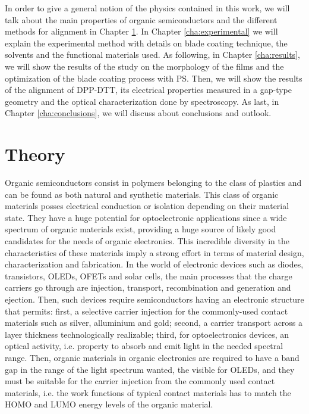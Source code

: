 \documentclass  [
  paper    = a4,
  BCOR     = 10mm,
  twoside,
  fontsize = 12pt,
  fleqn,
  toc      = bibnumbered,
  toc      = listofnumbered,
  numbers  = noendperiod,
  headings = normal,
  listof   = leveldown,
  version  = 3.03
]                                       {scrreprt}
\begin{document}
In order to give a general notion of the physics contained in this work, we will talk about the main properties of organic semiconductors and the different methods for alignment in Chapter \ref{cha:theory}. In Chapter \ref{cha:experimental} we will explain the experimental method with details on blade coating technique, the solvents and the functional materials used. As following, in Chapter \ref{cha:results}, we will show the results of the study on the morphology of the films and the optimization of the blade coating process with PS. Then, we will show the results of the alignment of DPP-DTT, its electrical properties measured in a gap-type geometry and the optical characterization done by spectroscopy. As last, in Chapter \ref{cha:conclusions}, we will discuss about conclusions and outlook.


\chapter{Theory}\label{cha:theory}


Organic semiconductors consist in polymers belonging to the class of plastics and can be found as both natural and synthetic materials. This class of organic materials posses electrical conduction or isolation depending on their material state. They have a huge potential for optoelectronic applications since a wide spectrum of organic materials exist, providing a huge source of likely good candidates for the needs of organic electronics. This incredible diversity in the characteristics of these materials imply a strong effort in terms of material design, characterization and fabrication. In the world of electronic devices such as diodes, transistors, OLEDs, OFETs and solar cells, the main processes that the charge carriers go through are injection, transport, recombination and generation and ejection. Then, such devices require semiconductors having an electronic structure that permits: first, a selective carrier injection for the commonly-used contact materials such as silver, alluminium and gold; second, a carrier transport across a layer thickness technologically realizable; third, for optoelectronics devices, an optical activity, i.e. property to absorb and emit light in the needed spectral range. Then, organic materials in organic electronics are required to have a band gap in the range of the light spectrum wanted, the visible for OLEDs, and they must be suitable for the carrier injection from the commonly used contact materials, i.e. the work functions of typical contact materials has to match the HOMO and LUMO energy levels of the organic material.\\
 
\end{document}
